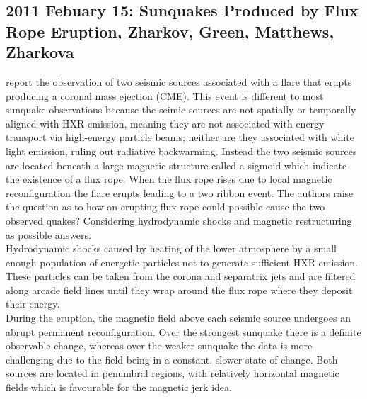 \subsection{2011 Febuary 15: Sunquakes Produced by Flux Rope Eruption, Zharkov, Green, Matthews, Zharkova}
\cite{2011ApJ...741L..35Z} report the observation of two seismic sources associated with a flare that erupts producing a coronal mass ejection (CME). This event is different to most sunquake observations because the seimic sources are not spatially or temporally aligned with HXR emission, meaning they are not associated with energy transport via high-energy particle beams; neither are they associated with white light emission, ruling out radiative backwarming. Instead the two seismic sources are located beneath a large magnetic structure called a sigmoid which indicate the existence of a flux rope. When the flux rope rises due to local magnetic reconfiguration the flare erupts leading to a two ribbon event. The authors raise the question as to how an erupting flux rope could possible cause the two observed quakes? Considering hydrodynamic shocks and magnetic restructuring as possible answers.\\
Hydrodynamic shocks caused by heating of the lower atmosphere by a small enough population of energetic particles not to generate sufficient HXR emission. These particles can be taken from the corona and separatrix jets and are filtered along arcade field lines until they wrap around the flux rope where they deposit their energy.   \\
During the eruption, the magnetic field above each seismic source undergoes an abrupt permanent reconfiguration. Over the strongest sunquake there is a definite observable change, whereas over the weaker sunquake the data is more challenging due to the field being in a constant, slower state of change. Both sources are located in penumbral regions, with relatively horizontal magnetic fields which is favourable for the magnetic jerk idea.\\
 




